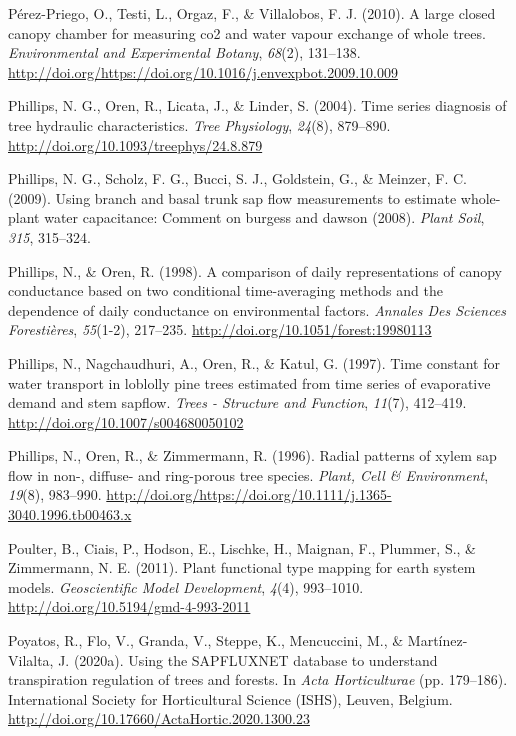 \documentclass[11pt,twoside]{reedthesis}
\begin{document}
\hypertarget{ref-Perezpriego2010}{}
Pérez-Priego, O., Testi, L., Orgaz, F., \& Villalobos, F. J. (2010). A
large closed canopy chamber for measuring co2 and water vapour exchange
of whole trees. \emph{Environmental and Experimental Botany},
\emph{68}(2), 131--138.
\url{http://doi.org/https://doi.org/10.1016/j.envexpbot.2009.10.009}

\hypertarget{ref-Phillips2004}{}
Phillips, N. G., Oren, R., Licata, J., \& Linder, S. (2004). Time series
diagnosis of tree hydraulic characteristics. \emph{Tree Physiology},
\emph{24}(8), 879--890. \url{http://doi.org/10.1093/treephys/24.8.879}

\hypertarget{ref-phillips2009}{}
Phillips, N. G., Scholz, F. G., Bucci, S. J., Goldstein, G., \& Meinzer,
F. C. (2009). Using branch and basal trunk sap flow measurements to
estimate whole-plant water capacitance: Comment on burgess and dawson
(2008). \emph{Plant Soil}, \emph{315}, 315--324.

\hypertarget{ref-phillips_comparison_1998}{}
Phillips, N., \& Oren, R. (1998). A comparison of daily representations
of canopy conductance based on two conditional time-averaging methods
and the dependence of daily conductance on environmental factors.
\emph{Annales Des Sciences Forestières}, \emph{55}(1-2), 217--235.
\url{http://doi.org/10.1051/forest:19980113}

\hypertarget{ref-Phillips1997}{}
Phillips, N., Nagchaudhuri, A., Oren, R., \& Katul, G. (1997). Time
constant for water transport in loblolly pine trees estimated from time
series of evaporative demand and stem sapflow. \emph{Trees - Structure
and Function}, \emph{11}(7), 412--419.
\url{http://doi.org/10.1007/s004680050102}

\hypertarget{ref-Phillips1996}{}
Phillips, N., Oren, R., \& Zimmermann, R. (1996). Radial patterns of
xylem sap flow in non-, diffuse- and ring-porous tree species.
\emph{Plant, Cell \& Environment}, \emph{19}(8), 983--990.
\url{http://doi.org/https://doi.org/10.1111/j.1365-3040.1996.tb00463.x}

\hypertarget{ref-Poulter2011}{}
Poulter, B., Ciais, P., Hodson, E., Lischke, H., Maignan, F., Plummer,
S., \& Zimmermann, N. E. (2011). Plant functional type mapping for earth
system models. \emph{Geoscientific Model Development}, \emph{4}(4),
993--1010. \url{http://doi.org/10.5194/gmd-4-993-2011}

\hypertarget{ref-poyatos2020b}{}
Poyatos, R., Flo, V., Granda, V., Steppe, K., Mencuccini, M., \&
Martínez-Vilalta, J. (2020a). Using the SAPFLUXNET database to
understand transpiration regulation of trees and forests. In \emph{Acta
Horticulturae} (pp. 179--186). International Society for Horticultural
Science (ISHS), Leuven, Belgium.
\url{http://doi.org/10.17660/ActaHortic.2020.1300.23}
\end{document}
